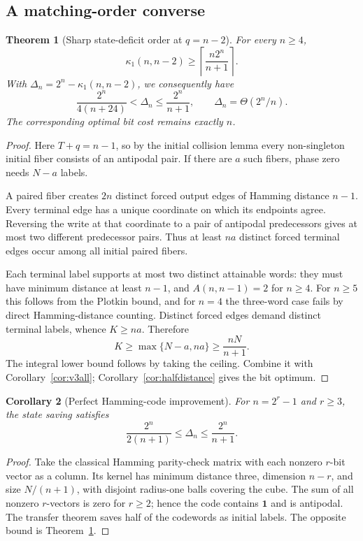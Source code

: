 \documentclass[11pt,a4paper]{article}
\newtheorem{theorem}{Theorem}[section]
\newtheorem{corollary}[theorem]{Corollary}
\begin{document}
\subsection{A matching-order converse}

\begin{theorem}[Sharp state-deficit order at $q=n-2$]\label{thm:v3deficit}
For every $n\ge4$,
\[
 \boxed{\quad \kappa_1(n,n-2)\ge
 \left\lceil\frac{n2^n}{n+1}\right\rceil.\quad}
\]
With $\Delta_n=2^n-\kappa_1(n,n-2)$, we consequently have
\[
 \boxed{\quad \frac{2^n}{4(n+24)}<\Delta_n\le
 \frac{2^n}{n+1},\qquad \Delta_n=\Theta(2^n/n).\quad}
\]
The corresponding optimal bit cost remains exactly $n$.
\end{theorem}
\begin{proof}
Here $T+q=n-1$, so by the initial collision lemma every non-singleton initial fiber consists of an antipodal pair. If there are $a$ such fibers, phase zero needs $N-a$ labels.

A paired fiber creates $2n$ distinct forced output edges of Hamming distance $n-1$. Every terminal edge has a unique coordinate on which its endpoints agree. Reversing the write at that coordinate to a pair of antipodal predecessors gives at most two different predecessor pairs. Thus at least $na$ distinct forced terminal edges occur among all initial paired fibers.

Each terminal label supports at most two distinct attainable words: they must have minimum distance at least $n-1$, and $A(n,n-1)=2$ for $n\ge4$. For $n\ge5$ this follows from the Plotkin bound, and for $n=4$ the three-word case fails by direct Hamming-distance counting. Distinct forced edges demand distinct terminal labels, whence $K\ge na$. Therefore
\[
 K\ge\max\{N-a,na\}\ge\frac{nN}{n+1}.
\]
The integral lower bound follows by taking the ceiling. Combine it with Corollary~\ref{cor:v3all}; Corollary~\ref{cor:halfdistance} gives the bit optimum.
\end{proof}

\begin{corollary}[Perfect Hamming-code improvement]\label{cor:v3hamming}
For $n=2^r-1$ and $r\ge3$, the state saving satisfies
\[
 \boxed{\qquad \frac{2^n}{2(n+1)}\le\Delta_n
 \le\frac{2^n}{n+1}.\qquad}
\]
\end{corollary}
\begin{proof}
Take the classical Hamming parity-check matrix with each nonzero $r$-bit vector as a column. Its kernel has minimum distance three, dimension $n-r$, and size $N/(n+1)$, with disjoint radius-one balls covering the cube. The sum of all nonzero $r$-vectors is zero for $r\ge2$; hence the code contains $\mathbf1$ and is antipodal. The transfer theorem saves half of the codewords as initial labels. The opposite bound is Theorem~\ref{thm:v3deficit}.
\end{proof}
\end{document}
